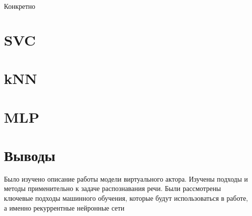 Конкретно




\section{SVC}
\section{kNN}
\section{MLP}


\section{Выводы}


Было изучено описание работы модели виртуального актора. Изучены подходы и методы применительно к задаче распознавания речи.
Были рассмотрены ключевые подходы машинного обучения, которые будут использоваться в работе, а именно рекуррентные нейронные сети

